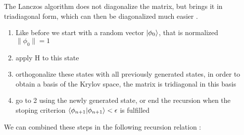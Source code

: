 \documentclass{article}
\begin{document}
The Lanczos algorithm does not diagonalize the matrix, but brings it
in  triadiagonal form, which can then be diagonalized much easier \cite{Fehske}.
\begin{enumerate}
\item\label{item:1} Like before we start with a random vector
  $\ket{\phi_0}$, that is normalized\\
 $\|\phi_0\| = 1$
\item\label{item:2} apply H to this state
\item\label{item:3} orthogonalize these states with all previously
  generated states, in order to
  obtain a basis of the Krylov space, the matrix is tridiagonal in this basis
\item\label{item:4} go to 2 using the newly generated state, or end the
  recursion when the stoping criterion $\braket{\phi_{n+1}|\phi_{n+1}}
  < \epsilon$ is fulfilled 

\end{enumerate}
We can combined these steps in the following recursion relation \cite{Fehske}:
\end{document}
